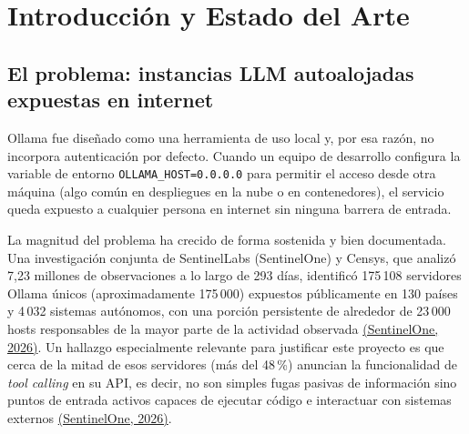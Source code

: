 \documentclass[11pt,letterpaper]{article}
\newcommand{\citeapa}[2]{\hyperlink{#1}{#2}}
\begin{document}
\begin{abstract}
\vspace{0.5em}
\noindent\textbf{Palabras clave:} seguridad en modelos de lenguaje, \emph{prompt injection}, defensa en profundidad, Ollama, OWASP LLM Top 10, \emph{guardrails}, mínimo privilegio, aprobación humana, AI-SPM, SIEM, Jev, Llama Prompt Guard, Garak.
\end{abstract}

\clearpage

\tableofcontents
\clearpage

\section{Introducción y Estado del Arte}

\subsection{El problema: instancias LLM autoalojadas expuestas en internet}

Ollama fue diseñado como una herramienta de uso local y, por esa razón, no incorpora autenticación por defecto. Cuando un equipo de desarrollo configura la variable de entorno \texttt{OLLAMA\_HOST=0.0.0.0} para permitir el acceso desde otra máquina (algo común en despliegues en la nube o en contenedores), el servicio queda expuesto a cualquier persona en internet sin ninguna barrera de entrada.

La magnitud del problema ha crecido de forma sostenida y bien documentada. Una investigación conjunta de SentinelLabs (SentinelOne) y Censys, que analizó 7{,}23 millones de observaciones a lo largo de 293 días, identificó 175\,108 servidores Ollama únicos (aproximadamente 175\,000) expuestos públicamente en 130 países y 4\,032 sistemas autónomos, con una porción persistente de alrededor de 23\,000 hosts responsables de la mayor parte de la actividad observada \citeapa{sentinelone2026}{(SentinelOne, 2026)}. Un hallazgo especialmente relevante para justificar este proyecto es que cerca de la mitad de esos servidores (más del 48\,\%) anuncian la funcionalidad de \emph{tool calling} en su API, es decir, no son simples fugas pasivas de información sino puntos de entrada activos capaces de ejecutar código e interactuar con sistemas externos \citeapa{sentinelone2026}{(SentinelOne, 2026)}.
\end{document}

